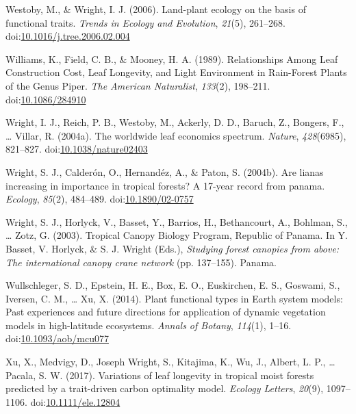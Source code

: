\documentclass[12pt,]{article}
\theoremstyle{definition}
\theoremstyle{definition}
\theoremstyle{definition}
\theoremstyle{remark}
\begin{document}
\leavevmode\hypertarget{ref-Westoby2006a}{}%
Westoby, M., \& Wright, I. J. (2006). Land-plant ecology on the basis of
functional traits. \emph{Trends in Ecology and Evolution}, \emph{21}(5),
261--268.
doi:\href{https://doi.org/10.1016/j.tree.2006.02.004}{10.1016/j.tree.2006.02.004}

\leavevmode\hypertarget{ref-Williams1989}{}%
Williams, K., Field, C. B., \& Mooney, H. A. (1989). Relationships Among
Leaf Construction Cost, Leaf Longevity, and Light Environment in
Rain-Forest Plants of the Genus Piper. \emph{The American Naturalist},
\emph{133}(2), 198--211.
doi:\href{https://doi.org/10.1086/284910}{10.1086/284910}

\leavevmode\hypertarget{ref-Wright2004a}{}%
Wright, I. J., Reich, P. B., Westoby, M., Ackerly, D. D., Baruch, Z.,
Bongers, F., \ldots{} Villar, R. (2004a). The worldwide leaf economics
spectrum. \emph{Nature}, \emph{428}(6985), 821--827.
doi:\href{https://doi.org/10.1038/nature02403}{10.1038/nature02403}

\leavevmode\hypertarget{ref-Wright2004}{}%
Wright, S. J., Calderón, O., Hernandéz, A., \& Paton, S. (2004b). Are
lianas increasing in importance in tropical forests? A 17-year record
from panama. \emph{Ecology}, \emph{85}(2), 484--489.
doi:\href{https://doi.org/10.1890/02-0757}{10.1890/02-0757}

\leavevmode\hypertarget{ref-Wright2003}{}%
Wright, S. J., Horlyck, V., Basset, Y., Barrios, H., Bethancourt, A.,
Bohlman, S., \ldots{} Zotz, G. (2003). Tropical Canopy Biology Program,
Republic of Panama. In Y. Basset, V. Horlyck, \& S. J. Wright (Eds.),
\emph{Studying forest canopies from above: The international canopy
crane network} (pp. 137--155). Panama.

\leavevmode\hypertarget{ref-Wullschleger2014}{}%
Wullschleger, S. D., Epstein, H. E., Box, E. O., Euskirchen, E. S.,
Goswami, S., Iversen, C. M., \ldots{} Xu, X. (2014). Plant functional
types in Earth system models: Past experiences and future directions for
application of dynamic vegetation models in high-latitude ecosystems.
\emph{Annals of Botany}, \emph{114}(1), 1--16.
doi:\href{https://doi.org/10.1093/aob/mcu077}{10.1093/aob/mcu077}

\leavevmode\hypertarget{ref-Xu2017}{}%
Xu, X., Medvigy, D., Joseph Wright, S., Kitajima, K., Wu, J., Albert, L.
P., \ldots{} Pacala, S. W. (2017). Variations of leaf longevity in
tropical moist forests predicted by a trait-driven carbon optimality
model. \emph{Ecology Letters}, \emph{20}(9), 1097--1106.
doi:\href{https://doi.org/10.1111/ele.12804}{10.1111/ele.12804}
\end{document}
